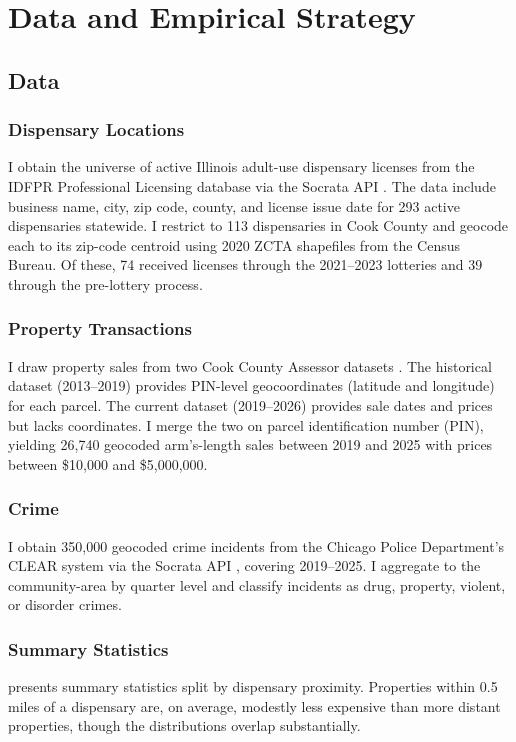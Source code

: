 \documentclass[12pt]{article}
\begin{document}
\section{Data and Empirical Strategy}

\subsection{Data}

\subsubsection*{Dispensary Locations} I obtain the universe of active Illinois adult-use dispensary licenses from the IDFPR Professional Licensing database via the Socrata API \citep{idfpr2024}. The data include business name, city, zip code, county, and license issue date for 293 active dispensaries statewide. I restrict to 113 dispensaries in Cook County and geocode each to its zip-code centroid using 2020 ZCTA shapefiles from the Census Bureau. Of these, 74 received licenses through the 2021--2023 lotteries and 39 through the pre-lottery process.

\subsubsection*{Property Transactions} I draw property sales from two Cook County Assessor datasets \citep{cookcounty2026}. The historical dataset (2013--2019) provides PIN-level geocoordinates (latitude and longitude) for each parcel. The current dataset (2019--2026) provides sale dates and prices but lacks coordinates. I merge the two on parcel identification number (PIN), yielding 26,740 geocoded arm's-length sales between 2019 and 2025 with prices between \$10,000 and \$5,000,000.

\subsubsection*{Crime} I obtain 350,000 geocoded crime incidents from the Chicago Police Department's CLEAR system via the Socrata API \citep{chicagopd2026}, covering 2019--2025. I aggregate to the community-area by quarter level and classify incidents as drug, property, violent, or disorder crimes.

\subsubsection*{Summary Statistics}  presents summary statistics split by dispensary proximity. Properties within 0.5 miles of a dispensary are, on average, modestly less expensive than more distant properties, though the distributions overlap substantially.
\end{document}
